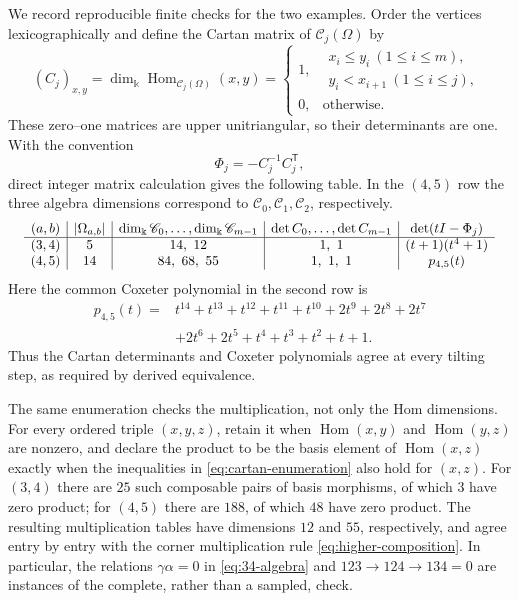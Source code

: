 \documentclass[12pt,a4paper,english,reqno]{amsart}
\theoremstyle{plain}
\theoremstyle{definition}
\newcommand{\kk}{\Bbbk}
\newcommand{\Hom}{\operatorname{Hom}}
\newcommand{\C}{\mathcal C}
\begin{document}
We record reproducible finite checks for the two examples.  Order the
vertices lexicographically and define the Cartan matrix of $\C_j(\Omega)$
by
\begin{equation}
 (C_j)_{x,y}
 =
 \dim_{\kk}\Hom_{\C_j(\Omega)}(x,y)
 =
 \begin{cases}
  1,&\begin{gathered}x_i\leq y_i\ (1\leq i\leq m),\\[-2pt]
      y_i<x_{i+1}\ (1\leq i\leq j),\end{gathered}\\
  0,&\text{otherwise}.
 \end{cases}
\label{eq:cartan-enumeration}
\end{equation}
These zero--one matrices are upper unitriangular, so their determinants are
one.  With the convention
\begin{equation}
 \Phi_j=-C_j^{-1}C_j^{\mathsf T},
\label{eq:coxeter-matrix}
\end{equation}
direct integer matrix calculation gives the following table.  In the
$(4,5)$ row the three algebra dimensions correspond to
$\C_0,\C_1,\C_2$, respectively.
\begin{equation}
\resizebox{0.98\textwidth}{!}{$
\begin{array}{c|c|c|c|c}
 (a,b)&|\Omega_{a,b}|&
 \dim_{\kk}\C_0,\ldots,\dim_{\kk}\C_{m-1}&
 \det C_0,\ldots,\det C_{m-1}&
 \det(tI-\Phi_j)\\ \hline
 (3,4)&5&14,\ 12&1,\ 1&(t+1)(t^4+1)\\
 (4,5)&14&84,\ 68,\ 55&1,\ 1,\ 1&p_{4,5}(t)
\end{array}$}
\label{eq:computed-invariants}
\end{equation}
Here the common Coxeter polynomial in the second row is
\begin{equation}
\begin{split}
 p_{4,5}(t)={}&t^{14}+t^{13}+t^{12}+t^{11}+t^{10}
 +2t^9+2t^8+2t^7\\
 &+2t^6+2t^5+t^4+t^3+t^2+t+1.
\end{split}
\label{eq:coxeter-45}
\end{equation}
Thus the Cartan determinants and Coxeter polynomials agree at every tilting
step, as required by derived equivalence.

The same enumeration checks the multiplication, not only the Hom
dimensions.  For every ordered triple $(x,y,z)$, retain it when
$\Hom(x,y)$ and $\Hom(y,z)$ are nonzero, and declare the product to be
the basis element of $\Hom(x,z)$ exactly when the inequalities in
\eqref{eq:cartan-enumeration} also hold for $(x,z)$.  For $(3,4)$ there
are $25$ such composable pairs of basis morphisms, of which $3$ have
zero product; for $(4,5)$ there are $188$, of which $48$ have zero
product.  The resulting multiplication tables have dimensions $12$ and
$55$, respectively, and agree entry by entry with the corner
multiplication rule \eqref{eq:higher-composition}.  In particular, the
relations $\gamma\alpha=0$ in \eqref{eq:34-algebra} and
$123\to124\to134=0$ are instances of the complete, rather than a sampled,
check.
\end{document}
